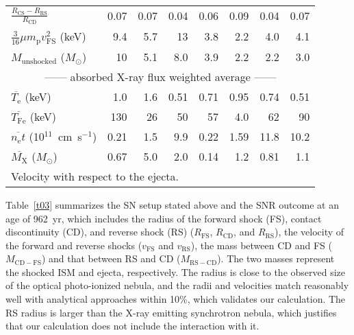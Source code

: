 \documentclass[]{pasj01}
\begin{document}
\begin{table*}[ht]
\begin{center}
\begin{tabular}{lrrrrrrr}
   $\frac{R_{\mathrm{CS}}-R_{\mathrm{RS}}}{R_{\mathrm{CD}}}$  & 0.07 & 0.07 & 0.04 & 0.06 & 0.09 & 0.04 & 0.07 \\
   $\frac{3}{16} \mu m_{\mathrm{p}}v_{\mathrm{FS}}^2$ (keV)   & 9.4  & 5.7  & 13   & 3.8  & 2.2 & 4.0  & 4.1 \\
   $M_{\mathrm{unshocked}}$ ($M_{\odot}$)               & 10  & 5.1  & 8.0  & 3.9  & 2.2 & 2.2 & 3.0 \\
   \multicolumn{8}{c}{------ absorbed X-ray flux weighted average ------}\\
   $\overline{T_{\mathrm{e}}}$ (keV)                    & 1.0  & 1.6 & 0.51 & 0.71 & 0.95 & 0.74 & 0.51 \\
   $\overline{T_{\mathrm{Fe}}}$ (keV)                   & 130  & 26  & 50   & 57   & 4.0  & 62  & 90 \\
   $\overline{n_{\mathrm{e}}t}$ (10$^{11}$~cm~s$^{-1}$) & 0.21 & 1.5 & 9.9  & 0.22 & 1.59 & 11.8 & 10.2 \\
   $\overline{M_{\mathrm{X}}}$ ($M_{\odot}$)            & 0.67 & 5.0 & 2.0  & 0.14 & 1.2  & 0.81 & 1.1 \\
   \hline
   \multicolumn{8}{l}{\parbox{70mm}{
   \footnotesize
   \par \noindent
   \footnotemark[$*$] Velocity with respect to the ejecta.\\
   }}
  \end{tabular}
 \end{center}
\end{table*}

Table~\ref{t03} summarizes the SN setup stated above and the SNR outcome at an age of
962~yr, which includes the radius of the forward shock (FS), contact discontinuity (CD),
and reverse shock (RS) ($R_{\mathrm{FS}}$, $R_{\mathrm{CD}}$, and $R_{\mathrm{RS}}$),
the velocity of the forward and reverse shocks ($v_{\mathrm{FS}}$ and
$v_{\mathrm{RS}}$), the mass between CD and FS ($M_{\mathrm{CD-FS}}$) and that between
RS and CD ($M_{\mathrm{RS-CD}}$). The two masses represent the shocked ISM and ejecta,
respectively. The radius is close to the observed size of the optical photo-ionized
nebula, and the radii and velocities match reasonably well with analytical approaches
\citep{chevalier82,truelove99} within 10\%, which validates our calculation. The RS
radius is larger than the X-ray emitting synchrotron nebula, which justifies that our
calculation does not include the interaction with it.
\end{document}
